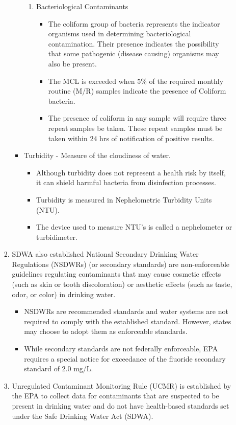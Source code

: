 \begin{itemize}
\begin{itemize}
\begin{enumerate}
\begin{itemize}
\begin{enumerate}
\item Bacteriological Contaminants
\begin{itemize}
\item The coliform group of bacteria represents the indicator organisms used in determining bacteriological contamination. Their presence indicates the possibility that some pathogenic (disease causing) organisms may also be present. 
\item The MCL is exceeded when 5\% of the required monthly routine (M/R) samples indicate the presence of Coliform bacteria. 
\item The presence of coliform in any sample will require three repeat samples be taken. These repeat samples must be taken within 24 hrs of notification of positive results.
\end{itemize}
\end{enumerate}
\item Turbidity - Measure of the cloudiness of water. 
\begin{itemize}
\item Although turbidity does not represent a health risk by itself, it can shield harmful bacteria from disinfection processes.
\item Turbidity is measured in Nephelometric Turbidity Units (NTU). 
\item The device used to measure NTU’s is called a nephelometer or turbidimeter.
\end{itemize}
\end{itemize}
\item SDWA also established National Secondary Drinking Water Regulations (NSDWRs) (or secondary standards) are non-enforceable guidelines regulating contaminants that may cause cosmetic effects (such as skin or tooth discoloration) or aesthetic effects (such as taste, odor, or color) in drinking water.
\begin{itemize}
\item NSDWRs are recommended standards and water systems are not required to comply with the established standard. However, states may choose to adopt them as enforceable standards.
\item While secondary standards are not federally enforceable, EPA requires a special notice for exceedance of the fluoride secondary standard of 2.0 mg/L.
\end{itemize}
\item Unregulated Contaminant Monitoring Rule (UCMR) is established by the EPA to collect data for contaminants that are suspected to be present in drinking water and do not have health-based standards set under the Safe Drinking Water Act (SDWA).
\begin{itemize}


\end{itemize}
\end{enumerate}
\end{itemize}
\end{itemize}

